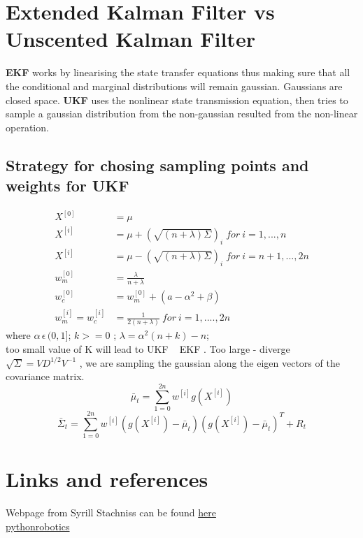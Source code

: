\documentclass{article}
\begin{document}
\section{Extended Kalman Filter vs Unscented Kalman Filter}
\textbf{EKF} works by linearising the state transfer equations 
thus making sure that all the conditional and marginal distributions 
will remain gaussian. Gaussians are closed space. \textbf{UKF} uses
the nonlinear state transmission equation, then tries to sample a 
gaussian distribution from the non-gaussian resulted from the non-linear
operation. 
\subsection{Strategy for chosing sampling points and weights for UKF}
\begin{align*}
X^{[0]} &= \mu\\
X^{[i]} &= \mu + (\sqrt{(n+\lambda)\Sigma})_i  \; for\: i = 1,...,n\\
X^{[i]} &= \mu - (\sqrt{(n+\lambda)\Sigma})_i  \; for\: i = n+1,...,2n\\
w_m^{[0]} &= \frac{\lambda}{n + \lambda}\\
w_c^{[0]} &= w_m^{[0]} + (a -\alpha^2 + \beta)\\
w_m^{[i]} = w_c^{[i]} &= \frac{1}{2(n+\lambda)} \: for \: i = 1,....,2n
\end{align*}
where $\alpha \, \epsilon \, (0,1]$; $k>= 0$ ; $\lambda = \alpha^2(n+k) - n$;\\
too small value of K will lead to UKF ~ EKF . Too large - diverge\\
$\sqrt{\Sigma} =  VD^{1/2}V^{-1}$ , we are sampling the gaussian along the eigen vectors
of the covariance matrix. \\
$$\bar\mu_t = \sum_{1 = 0}^{2n}w^{[i]}g(X^{[i]})$$
$$\bar\Sigma_t = \sum_{1 = 0}^{2n}w^{[i]}(g(X^{[i]}) - \bar\mu_t)(g(X^{[i]}) - \bar\mu_t)^T + R_t$$
\section{Links and references}
Webpage from Syrill Stachniss can be found \href{http://ais.informatik.uni-freiburg.de/teaching/ws13/mapping/}{here}\\
\href{https://pythonrobotics.readthedocs.io}{pythonrobotics}
\end{document}

